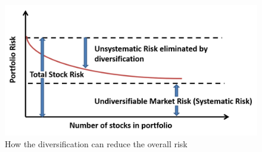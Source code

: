 \begin{figure}
\centering
\includegraphics[scale=0.6]{Diversification} 
\caption{How the diversification can reduce the overall risk}
\label{fig:div}
\end{figure}

